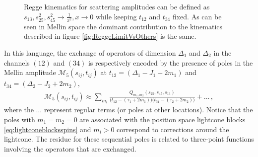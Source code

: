 \begin{figure}[t!]
  \caption{ Regge kinematics for scattering amplitudes can be defined as $s_{13},s_{25}^2,s_{45}^2\rightarrow \frac{1}{x^2},x\rightarrow 0$ while keeping $t_{12}$ and $t_{34}$ fixed. As can be seen in Mellin space the dominant contribution to the kinematics described in figure \ref{fig:ReggeLimitVsOthers} is the same.
  }
  \label{fig:ReggeKineScatt}
\end{figure}

In this language, the exchange of operators of dimension $\Delta_1$ and $\Delta_2$ in the channels $(12)$ and $(34)$ is  respectively encoded  by the presence of poles in the Mellin amplitude
$\mathcal{M}_{5}(s_{ij},t_{ij})$ at $t_{12}=(\Delta_1-J_1+2m_1)$ and $t_{34} =  (\Delta_2-J_2+2m_2)$,
\begin{align}
  \mathcal{M}_{5}(s_{ij},t_{ij}) \approx \sum_{m_i}\frac{Q_{m_1,m_2}(s_{25},s_{45},s_{13})}{\big(t_{12}-(\tau_1+2m_1)\big)\big(t_{34}-(\tau_2+2m_2)\big)}+\dots\,,
  \label{eq:MellinamplitudepolesQ}
\end{align}
where the $\dots$ represent regular terms (or poles at other locations). Notice that the poles with $m_1=m_2=0$ are associated with the position space lightcone blocks \ref{eq:lightconeblocksspins} and $m_i>0$ correspond to corrections around the lightcone. The residue for these sequential poles is related to three-point functions involving the operators that are exchanged.


